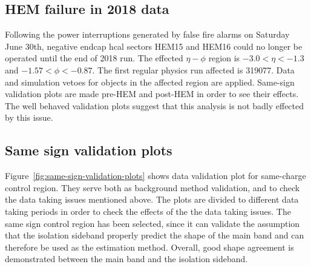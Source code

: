 \subsection{HEM failure in 2018 data}

Following the power interruptions generated by false fire alarms on Saturday June 30th, negative endcap \gls{hcal} sectors HEM15 and HEM16 could no longer be operated until the end of 2018 run. The effected $\eta-\phi$ region is $-3.0<\eta<-1.3$ and $-1.57<\phi< -0.87$. The first regular physics run affected is 319077. Data and simulation vetoes for objects in the affected region are applied. Same-sign validation plots are made pre-HEM and post-HEM in order to see their effects. The well behaved validation plots suggest that this analysis is not badly effected by this issue.

\subsection{Same sign validation plots}
\label{sec:same-sign-validation-plots}

Figure~\ref{fig:same-sign-validation-plots} shows data validation plot for same-charge control region. They serve both as background method validation, and to check the data taking issues mentioned above. The plots are divided to different data taking periods in order to check the effects of the the data taking issues. The same sign control region has been selected, since it can validate the assumption that the isolation sideband properly predict the shape of the main band and can therefore be used as the estimation method. Overall, good shape agreement is demonstrated between the main band and the isolation sideband.

